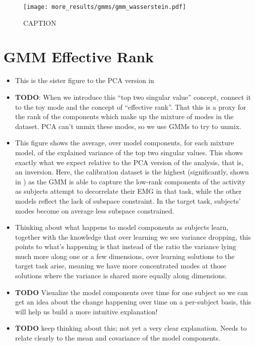 \documentclass[../main.tex]{subfiles}
\begin{document}
\begin{figure}[H]%
  \centering
    \texttt{[image: more\_results/gmms/gmm\_wasserstein.pdf]}
    \caption[Wasserstein distance between GMMs]{CAPTION}\label{fig:gmm_w2}
\end{figure}


\section{GMM Effective Rank}

\begin{itemize}
  \setlength\itemsep{0em}
  \item This is the sister figure to the PCA version in 
  \item \textbf{TODO}: When we introduce this ``top two singular value'' concept, connect it to the toy mode  and the concept of ``effective rank''. That this is a proxy for the rank of the components which make up the mixture of modes in the dataset. PCA can't unmix these modes, so we use GMMs to try to unmix.
  \item This figure shows the average, over model components, for each mixture model, of the explained variance of the top two singular values. This shows exactly what we expect relative to the PCA version of the analysis, that is, an inversion. Here, the calibration dataset is the highest (significantly, shown in ) as the GMM is able to capture the low-rank components of the activity as subjects attempt to decorrelate their EMG in that task, while the other models reflect the lack of subspace constraint. In the target task, subjects' modes become on average less subspace constrained. 
  \item Thinking about what happens to model components as subjects learn, together with the knowledge that over learning we see variance dropping, this points to what's happening is that instead of the ratio the variance lying much more along one or a few dimensions, over learning solutions to the target task arise, meaning we have more concentrated modes at those solutions where the variance is shared more equally along dimensions. 
  \item \textbf{TODO} Visualize the model components over time for one subject so we can get an idea about the change happening over time on a per-subject basis, this will help us build a more intuitive explanation!
  \item \textbf{TODO} keep thinking about this; not yet a very clear explanation. Needs to relate clearly to the mean and covariance of the model components.

\end{itemize}
\end{document}
